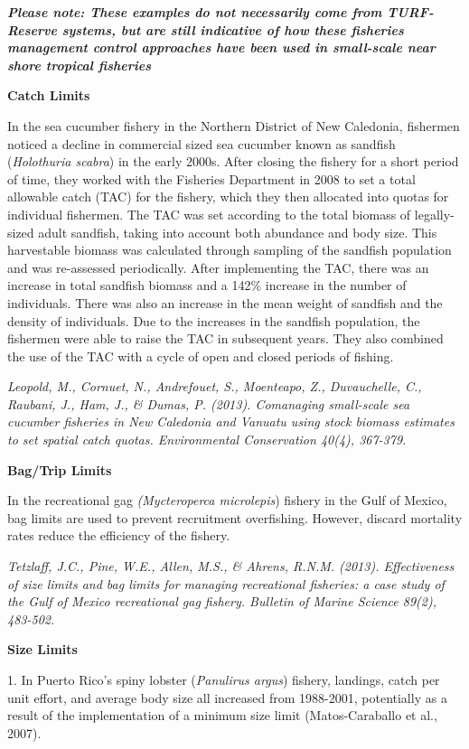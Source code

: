 \documentclass[]{book}
\begin{document}
\textbf{\emph{Please note: These examples do not necessarily come from
TURF-Reserve systems, but are still indicative of how these fisheries
management control approaches have been used in small-scale near shore
tropical fisheries}}

\textbf{Catch Limits}

In the sea cucumber fishery in the Northern District of New Caledonia,
fishermen noticed a decline in commercial sized sea cucumber known as
sandfish (\emph{Holothuria scabra}) in the early 2000s. After closing
the fishery for a short period of time, they worked with the Fisheries
Department in 2008 to set a total allowable catch (TAC) for the fishery,
which they then allocated into quotas for individual fishermen. The TAC
was set according to the total biomass of legally-sized adult sandfish,
taking into account both abundance and body size. This harvestable
biomass was calculated through sampling of the sandfish population and
was re-assessed periodically. After implementing the TAC, there was an
increase in total sandfish biomass and a 142\% increase in the number of
individuals. There was also an increase in the mean weight of sandfish
and the density of individuals. Due to the increases in the sandfish
population, the fishermen were able to raise the TAC in subsequent
years. They also combined the use of the TAC with a cycle of open and
closed periods of fishing.

\emph{Leopold, M., Cornuet, N., Andrefouet, S., Moenteapo, Z.,
Duvauchelle, C., Raubani, J., Ham, J., \& Dumas, P. (2013). Comanaging
small-scale sea cucumber fisheries in New Caledonia and Vanuatu using
stock biomass estimates to set spatial catch quotas. Environmental
Conservation 40(4), 367-379.}

\textbf{Bag/Trip Limits}

In the recreational gag \emph{(Mycteroperca microlepis}) fishery in the
Gulf of Mexico, bag limits are used to prevent recruitment overfishing.
However, discard mortality rates reduce the efficiency of the fishery.

\emph{Tetzlaff, J.C., Pine, W.E., Allen, M.S., \& Ahrens, R.N.M. (2013).
Effectiveness of size limits and bag limits for managing recreational
fisheries: a case study of the Gulf of Mexico recreational gag fishery.
Bulletin of Marine Science 89(2), 483-502.}

\textbf{Size Limits}

1. In Puerto Rico's spiny lobster (\emph{Panulirus argus}) fishery,
landings, catch per unit effort, and average body size all increased
from 1988-2001, potentially as a result of the implementation of a
minimum size limit (Matos-Caraballo et al., 2007).
\end{document}
